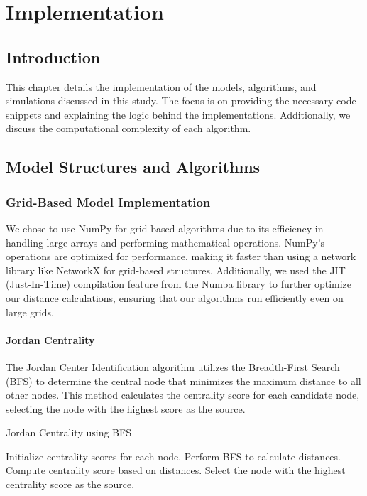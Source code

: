 \chapter{Implementation}

\section{Introduction}
This chapter details the implementation of the models, algorithms, and simulations discussed in this study. The focus is on providing the necessary code snippets and explaining the logic behind the implementations. Additionally, we discuss the computational complexity of each algorithm.

\section{Model Structures and Algorithms}

\subsection{Grid-Based Model Implementation}
We chose to use NumPy for grid-based algorithms due to its efficiency in handling large arrays and performing mathematical operations. NumPy's operations are optimized for performance, making it faster than using a network library like NetworkX for grid-based structures. Additionally, we used the JIT (Just-In-Time) compilation feature from the Numba library to further optimize our distance calculations, ensuring that our algorithms run efficiently even on large grids.

\subsubsection{Jordan Centrality}
The Jordan Center Identification algorithm utilizes the Breadth-First Search (BFS) to determine the central node that minimizes the maximum distance to all other nodes. This method calculates the centrality score for each candidate node, selecting the node with the highest score as the source.

\begin{algorithm}
\caption{Jordan Centrality using BFS}
\begin{algorithmic}[1]
\STATE Initialize centrality scores for each node.
    \STATE Perform BFS to calculate distances.
    \STATE Compute centrality score based on distances.
\ENDFOR
\STATE Select the node with the highest centrality score as the source.
\end{algorithmic}
\end{algorithm}

